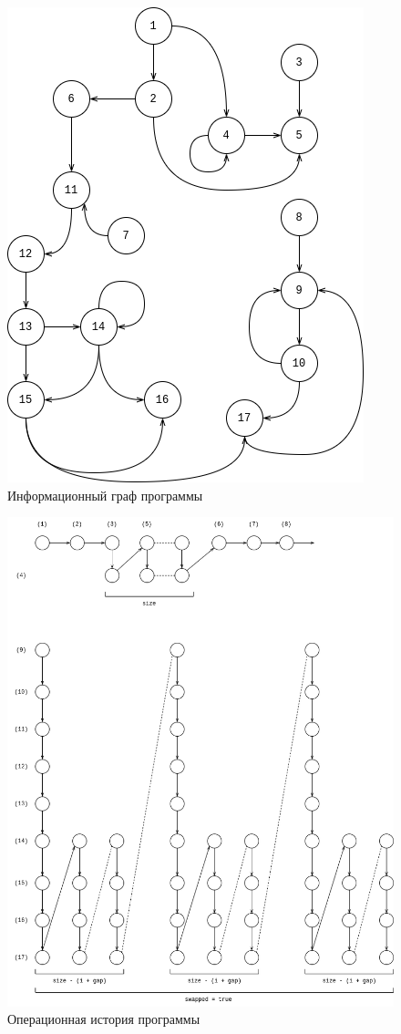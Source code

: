 \documentclass[14pt,a4paper]{scrreprt}
\begin{document}
\begin{center}
	\begin{figure}[H]
		\captionsetup{singlelinecheck = false, justification=centering}
		\centering
		\includegraphics[width=0.5\linewidth]{assets/pgraph.png}
		\caption{Информационный граф программы}
	\end{figure}
\end{center}

\begin{center}
	\begin{figure}[H]
		\captionsetup{singlelinecheck = false, justification=centering}
		\centering
		\includegraphics[width=\linewidth]{assets/comb-ohist.drawio.png}
		\caption{Операционная история программы}
	\end{figure}
\end{center}
\end{document}
